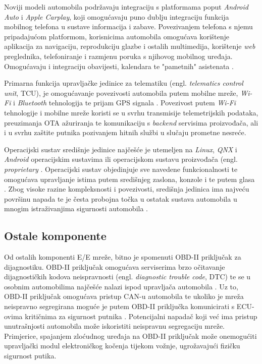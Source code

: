 \documentclass[times, utf8, diplomski, numeric]{fer}
\begin{document}
Noviji modeli automobila podržavaju integraciju s platformama poput \textit{Android Auto} i \textit{Apple Carplay}, koji omogućavaju puno dublju integraciju funkcija mobilnog telefona u sustave informacija i zabave. Povezivanjem telefona s njemu pripadajućom platformom, korisnicima automobila omogućava korištenje aplikacija za navigaciju, reprodukciju glazbe i ostalih multimedija, korištenje \textit{web} preglednika, telefoniranje i razmjenu poruka s njihovog mobilnog uređaja. Omogućavaju i integraciju obavijesti, kalendara te "pametnih" asistenata \cite{androidauto, carplay}.

Primarna funkcija upravljačke jedinice za telematiku (engl. \textit{telematics control unit}, TCU), je omogućavanje povezivosti automobila putem mobilne mreže, \textit{Wi-Fi} i \textit{Bluetooth} tehnologija te prijam GPS signala \cite{nasser2023automotive}. Povezivost putem \textit{Wi-Fi} tehnologije i mobilne mreže koristi se u svrhu transmisije telemetrijskih podataka, preuzimanja OTA ažuriranja te komunikaciju s \textit{backend} servisima proizvođača, ali i u svrhu zaštite putnika pozivanjem hitnih službi u slučaju prometne nesreće.

Operacijski sustav središnje jedinice najčešće je utemeljen na \textit{Linux}, \textit{QNX} i \textit{Android} operacijskim sustavima ili operacijskom sustavu proizvođača (engl. \textit{proprietary} \cite{nasser2023automotive}. Operacijski sustav objedinjuje sve navedene funkcionalnosti te omogućava upravljanje istima putem središnjeg zaslona, konzole i te putem glasa \cite{bosch2022handbook}. Zbog visoke razine kompleksnosti i povezivosti, središnja jedinica ima najveću površinu napada te je česta probojna točka u ostatak sustava automobila u mnogim istraživanjima sigurnosti automobila \cite{aliwa2021cyberattacks, knight2020hacking, smith2016car, tencent2018bmw, miller2015remote}.

\subsection{Ostale komponente}
Od ostalih komponenti E/E mreže, bitno je spomenuti OBD-II priključak za dijagnostiku. OBD-II priključak omogućava serviserima brzo očitavanje dijagnostičkih kodova neispravnosti (engl. \textit{diagnostic trouble code}, DTC) te se u osobnim automobilima najčešće nalazi ispod upravljača automobila \cite{smith2016car}. Uz to, OBD-II priključak omogućava pristup CAN-u automobila te ukoliko je mreža neispravno segregirana moguće je putem OBD-II priključka  komunicirati s ECU-ovima kritičnima za sigurnost putnika \cite{knight2020hacking, smith2016car}. Potencijalni napadač koji već ima pristup unutrašnjosti automobila može iskoristiti neispravnu segregaciju mreže. Primjerice, spajanjem zloćudnog uređaja na OBD-II priključak može onemogućiti upravljački modul elektroničkog kočenja tijekom vožnje, ugrožavajući fizičku sigurnost putika.  
\end{document}
